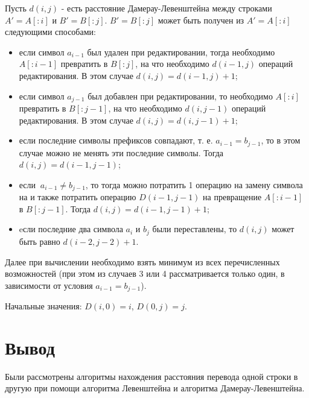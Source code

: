 Пусть $d(i,j)$ - есть расстояние Дамерау-Левенштейна между строками $A'= A[:i]$ и $B' = B[:j]$. $B' = B[:j]$ может быть получен из $A'= A[:i]$ следующими способами:

\begin{itemize}
	\item если символ $a_{i-1}$ был удален при редактировании, тогда необходимо $A[:i-1]$ превратить в $B[:j]$, на что необходимо $d(i-1,j)$ операций редактирования. В этом случае $d(i,j) = d(i-1,j) + 1$;
	\item если символ $a_{j-1}$ был добавлен при редактировании, то необходимо $A[:i]$ превратить в $B[:j-1]$, на что необходимо $d(i,j-1)$ операций редактирования. В этом случае $d(i,j) = d(i,j-1) + 1$;
	\item если последние символы префиксов совпадают, т. е. $a_{i-1} = b_{j-1}$, то в этом случае можно не менять эти последние символы. Тогда $d(i,j) = d(i-1,j-1)$;
	\item если $\medspace a_{i-1} \neq b_{j-1}$, то тогда можно потратить 1 операцию на замену символа  на и также потратить  операцию $D(i-1,j-1)$ на превращение $A[:i-1]$ в $B[:j-1]$. Тогда $d(i,j) = d(i-1,j-1) + 1$;
	\item eсли последние два символа $a_{i}$ и $b_{j}$ были переставлены, то $d(i,j)$ может быть равно $d(i-2,j-2) + 1$.
\end{itemize}

Далее при вычислении  необходимо взять минимум из всех перечисленных возможностей (при этом из случаев 3 или 4 рассматривается только один, в зависимости от условия $a_{i-1} = b_{j-1}$).

Начальные значения: $D(i,0) = i$, $D(0,j) = j$.

\section*{Вывод}

Были рассмотрены алгоритмы нахождения расстояния перевода одной строки в другую при помощи алгоритма Левенштейна и алгоритма Дамерау-Левенштейна.